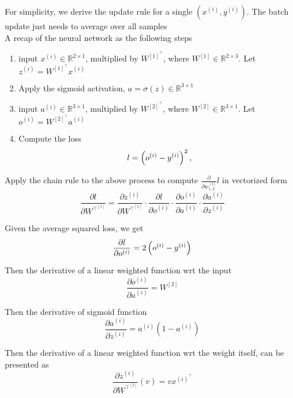 \begin{answer}

For simplicity, we derive the update rule for a single $(x^{(i)}, y^{(i)})$. The batch update just needs to average over all samples \\ 

A recap of the neural network as the following steps 
    \begin{enumerate}
        \item input $x^{(i)} \in \mathbb{R}^{2 \times 1}$, multiplied by $W^{[1]}^\top$, where $W^{[1]} \in \mathbb{R}^{2 \times 3}$. Let $z^{(i)} = W^{[1]}^\top x^{(i)}$
        \item Apply the sigmoid activation, $a = \sigma(z) \in \mathbb{R}^{3 \times 1}$
        \item input $a^{(i)} \in \mathbb{R}^{3 \times 1}$, multiplied by $W^{[2]}^\top$, where $W^{[2]} \in \mathbb{R}^{3 \times 1}$. Let $o^{(i)} = W^{[2]}^\top a^{(i)}$
        \item Compute the loss $$l = \left(o^{(i)} - y^{(i)}\right)^2,$$
    \end{enumerate}

Apply the chain rule to the above process to compute $\frac{\partial }{\partial w_{1, 2}^{[1]}}l$ in vectorized form
\begin{equation}
    \frac{\partial l}{\partial W^\top^{[1]}} = \frac{\partial z^{(i)}}{\partial W^\top ^{[1]}} \cdot \frac{\partial l}{\partial o^{(i)}} \cdot \frac{\partial o^{(i)}}{\partial a^{(i)}} \cdot \frac{\partial a^{(i)}}{\partial z^{(i)}}
\end{equation}

Given the average squared loss, we get 
\begin{equation}
\frac{\partial l}{\partial o^{(i)}} = 2 \left(o^{(i)} - y^{(i)}\right)
\end{equation}

Then the derivative of a linear weighted function wrt the input 
\begin{equation}
    \frac{\partial o^{(i)}}{\partial a^{(i)}} = W^{[2]}
\end{equation}

Then the derivative of sigmoid function
\begin{equation}
    \frac{\partial a^{(i)}}{\partial z^{(i)}} = a^{(i)} (1 - a^{(i)})
\end{equation}

Then the derivative of a linear weighted function wrt the weight itself, can be presented as 
\begin{equation}
    \frac{\partial z^{(i)}}{\partial W^\top ^{[1]}} (v) = v x^{(i)}^\top
\end{equation}


\end{answer}
